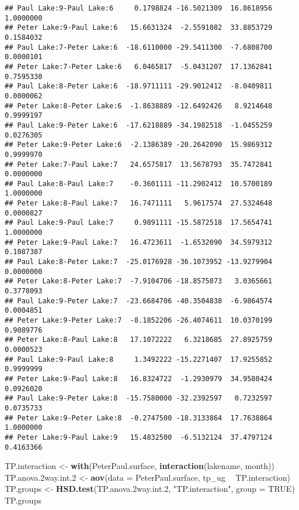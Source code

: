 \documentclass[]{article}
\newenvironment{Shaded}{\begin{snugshade}}{\end{snugshade}}
\newcommand{\DataTypeTok}[1]{\textcolor[rgb]{0.13,0.29,0.53}{#1}}
\newcommand{\FloatTok}[1]{\textcolor[rgb]{0.00,0.00,0.81}{#1}}
\newcommand{\KeywordTok}[1]{\textcolor[rgb]{0.13,0.29,0.53}{\textbf{#1}}}
\newcommand{\NormalTok}[1]{#1}
\newcommand{\OperatorTok}[1]{\textcolor[rgb]{0.81,0.36,0.00}{\textbf{#1}}}
\newcommand{\OtherTok}[1]{\textcolor[rgb]{0.56,0.35,0.01}{#1}}
\newcommand{\StringTok}[1]{\textcolor[rgb]{0.31,0.60,0.02}{#1}}
\begin{document}
\begin{verbatim}
## Paul Lake:9-Paul Lake:6     0.1798824 -16.5021309  16.8618956 1.0000000
## Peter Lake:9-Paul Lake:6   15.6631324  -2.5591082  33.8853729 0.1584032
## Paul Lake:7-Peter Lake:6  -18.6110000 -29.5411300  -7.6808700 0.0000101
## Peter Lake:7-Peter Lake:6   6.0465817  -5.0431207  17.1362841 0.7595330
## Paul Lake:8-Peter Lake:6  -18.9711111 -29.9012412  -8.0409811 0.0000062
## Peter Lake:8-Peter Lake:6  -1.8638889 -12.6492426   8.9214648 0.9999197
## Paul Lake:9-Peter Lake:6  -17.6218889 -34.1982518  -1.0455259 0.0276305
## Peter Lake:9-Peter Lake:6  -2.1386389 -20.2642090  15.9869312 0.9999970
## Peter Lake:7-Paul Lake:7   24.6575817  13.5678793  35.7472841 0.0000000
## Paul Lake:8-Paul Lake:7    -0.3601111 -11.2902412  10.5700189 1.0000000
## Peter Lake:8-Paul Lake:7   16.7471111   5.9617574  27.5324648 0.0000827
## Paul Lake:9-Paul Lake:7     0.9891111 -15.5872518  17.5654741 1.0000000
## Peter Lake:9-Paul Lake:7   16.4723611  -1.6532090  34.5979312 0.1087387
## Paul Lake:8-Peter Lake:7  -25.0176928 -36.1073952 -13.9279904 0.0000000
## Peter Lake:8-Peter Lake:7  -7.9104706 -18.8575073   3.0365661 0.3778093
## Paul Lake:9-Peter Lake:7  -23.6684706 -40.3504838  -6.9864574 0.0004851
## Peter Lake:9-Peter Lake:7  -8.1852206 -26.4074611  10.0370199 0.9089776
## Peter Lake:8-Paul Lake:8   17.1072222   6.3218685  27.8925759 0.0000523
## Paul Lake:9-Paul Lake:8     1.3492222 -15.2271407  17.9255852 0.9999999
## Peter Lake:9-Paul Lake:8   16.8324722  -1.2930979  34.9580424 0.0926020
## Paul Lake:9-Peter Lake:8  -15.7580000 -32.2392597   0.7232597 0.0735733
## Peter Lake:9-Peter Lake:8  -0.2747500 -18.3133864  17.7638864 1.0000000
## Peter Lake:9-Paul Lake:9   15.4832500  -6.5132124  37.4797124 0.4163366
\end{verbatim}

\begin{Shaded}
\begin{Highlighting}[]
\NormalTok{TP.interaction <-}\StringTok{ }\KeywordTok{with}\NormalTok{(PeterPaul.surface, }\KeywordTok{interaction}\NormalTok{(lakename, month))}
\NormalTok{TP.anova}\FloatTok{.2}\NormalTok{way.int}\FloatTok{.2}\NormalTok{ <-}\StringTok{ }\KeywordTok{aov}\NormalTok{(}\DataTypeTok{data =}\NormalTok{ PeterPaul.surface, tp_ug }\OperatorTok{~}\StringTok{ }\NormalTok{TP.interaction)}
\NormalTok{TP.groups <-}\StringTok{ }\KeywordTok{HSD.test}\NormalTok{(TP.anova}\FloatTok{.2}\NormalTok{way.int}\FloatTok{.2}\NormalTok{, }\StringTok{"TP.interaction"}\NormalTok{, }\DataTypeTok{group =} \OtherTok{TRUE}\NormalTok{)}
\NormalTok{TP.groups}
\end{Highlighting}
\end{Shaded}
\end{document}
